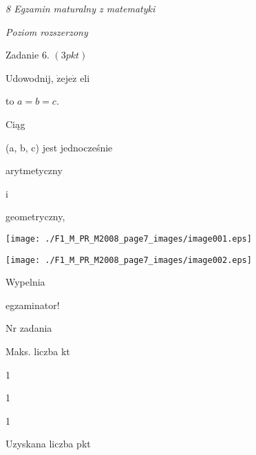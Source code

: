 \documentclass[a4paper,12pt]{article}
\begin{document}
{\it 8 Egzamin maturalny z matematyki}

{\it Poziom rozszerzony}

Zadanie 6. $(3pkt)$

Udowodnij, $\dot{\mathrm{z}}\mathrm{e} \mathrm{j}\mathrm{e}\dot{\mathrm{z}}$ eli

to $a=b=c.$

Ciąg

(a, b, c) jest jednocześnie

arytmetyczny

i

geometryczny,
\begin{center}
\texttt{[image: ./F1\_M\_PR\_M2008\_page7\_images/image001.eps]}

\texttt{[image: ./F1\_M\_PR\_M2008\_page7\_images/image002.eps]}
\end{center}
Wypelnia

egzaminator!

Nr zadania

Maks. liczba kt

1

1

1

Uzyskana liczba pkt
\end{document}
